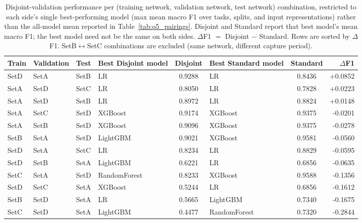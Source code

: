 \begin{table}
\caption{Disjoint-validation performance per (training network, validation network, test network) combination, restricted to each side's single best-performing model (max mean macro F1 over tasks, splits, and input representations) rather than the all-model mean reported in Table~\ref{tab:q5_pairings}. Disjoint and Standard report that best model's mean macro F1; the best model need not be the same on both sides. $\Delta$F1 $=$ Disjoint $-$ Standard. Rows are sorted by $\Delta$F1. SetB$\leftrightarrow$SetC combinations are excluded (same network, different capture period).}
\label{tab:q5_pairings_best_models_only}
\centering
\small
\begin{tabular}{llllclcr}
\toprule
Train & Validation & Test & Best Disjoint model & Disjoint & Best Standard model & Standard & $\Delta$F1 \\
\midrule
SetD & SetA & SetB & LR & 0.9288 & LR & 0.8436 & +0.0852 \\
SetA & SetD & SetC & LR & 0.8050 & LR & 0.7828 & +0.0223 \\
SetA & SetD & SetB & LR & 0.8972 & LR & 0.8824 & +0.0148 \\
SetA & SetC & SetD & XGBoost & 0.9174 & XGBoost & 0.9375 & -0.0201 \\
SetA & SetB & SetD & XGBoost & 0.9096 & XGBoost & 0.9375 & -0.0278 \\
SetB & SetA & SetD & LightGBM & 0.9021 & XGBoost & 0.9581 & -0.0560 \\
SetD & SetA & SetC & LR & 0.8234 & LR & 0.8829 & -0.0595 \\
SetD & SetB & SetA & LightGBM & 0.6221 & LR & 0.6856 & -0.0635 \\
SetC & SetA & SetD & RandomForest & 0.8233 & XGBoost & 0.9588 & -0.1356 \\
SetD & SetC & SetA & XGBoost & 0.5244 & LR & 0.6856 & -0.1612 \\
SetB & SetD & SetA & LR & 0.5665 & LightGBM & 0.7340 & -0.1675 \\
SetC & SetD & SetA & LightGBM & 0.4477 & RandomForest & 0.7320 & -0.2844 \\
\bottomrule
\end{tabular}
\end{table}
